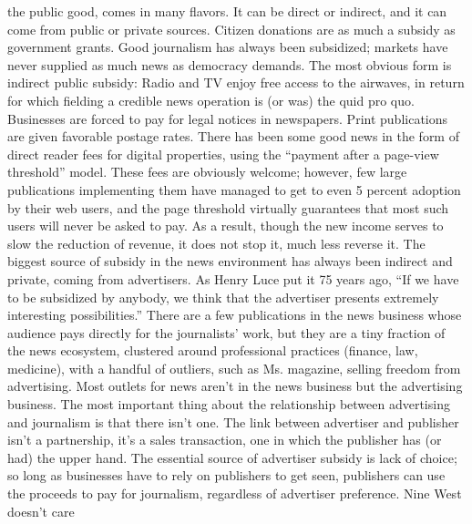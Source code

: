 the public good, comes in many flavors. It can be direct or indirect, and it can
come from public or private sources. Citizen donations are as much a subsidy
as government grants.
Good journalism has always been subsidized; markets have never supplied as
much news as democracy demands. The most obvious form is indirect public
subsidy: Radio and TV enjoy free access to the airwaves, in return for which
fielding a credible news operation is (or was) the quid pro quo. Businesses
are forced to pay for legal notices in newspapers. Print publications are given
favorable postage rates.
There has been some good news in the form of direct reader fees for digital
properties, using the ``payment after a page-view threshold'' model. These fees
are obviously welcome; however, few large publications implementing them have
managed to get to even 5 percent adoption by their web users, and the page
threshold virtually guarantees that most such users will never be asked to pay. As
a result, though the new income serves to slow the reduction of revenue, it does
not stop it, much less reverse it.
The biggest source of subsidy in the news environment has always been indirect
and private, coming from advertisers. As Henry Luce put it 75 years ago, ``If we
have to be subsidized by anybody, we think that the advertiser presents extremely
interesting possibilities.''
There are a few publications in the news business whose audience pays directly
for the journalists’ work, but they are a tiny fraction of the news ecosystem,
clustered around professional practices (finance, law, medicine), with a handful of
outliers, such as Ms. magazine, selling freedom from advertising. Most outlets for
news aren’t in the news business but the advertising business.
The most important thing about the relationship between advertising and journalism
is that there isn’t one. The link between advertiser and publisher isn’t a
partnership, it’s a sales transaction, one in which the publisher has (or had) the
upper hand. The essential source of advertiser subsidy is lack of choice; so long as
businesses have to rely on publishers to get seen, publishers can use the proceeds
to pay for journalism, regardless of advertiser preference. Nine West doesn’t care

